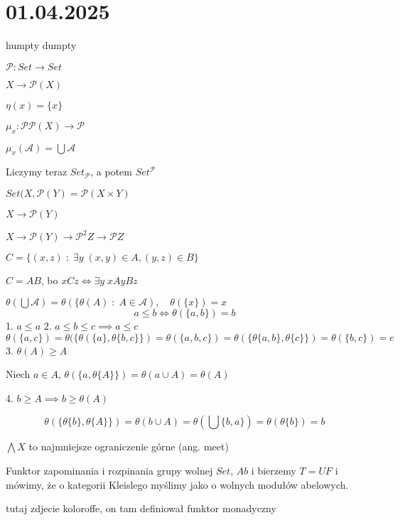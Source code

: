 \section{01.04.2025}{humpty dumpty}

$\mathcal{P}:Set\to Set$

$X\to \mathcal{P}(X)$

$\eta(x)=\{x\}$

$\mu_x:\mathcal{P}\mathcal{P}(X)\to \mathcal{P}$

$\mu_x(\mathcal{A})=\bigcup\mathcal{A}$

Liczymy teraz $Set_\mathcal{P}$, a potem $Set^\mathcal{P}$

$Set(X, \mathcal{P}(Y)=\mathcal{P}(X\times Y)$

$X\to \mathcal{P}(Y)$

$X\to \mathcal{P}(Y)\to\mathcal{P}^2Z\to\mathcal{P}Z$

$C=\{(x, z)\;:\;\exists y\;(x,y)\in A,(y,z)\in B\}$

$C=AB$, bo $xCz\iff \exists y\;xAyBz$

$\theta(\bigcup \mathcal{A})=\theta(\{\theta(A)\;:\;A\in\mathcal{A}),\quad \theta(\{x\})=x$
$$a\leq b\iff \theta(\{a,b\})=b$$
1. $a\leq a$
2. $a\leq b\leq c\implies a\leq c$
$$\theta(\{a, c\})=\theta(\{\theta(\{a\}, \theta\{b,c\}\})=\theta(\{a,b,c\})=\theta(\{\theta\{a,b\}, \theta\{c\}\})=\theta(\{b, c\})=c$$
3. $\theta(A)\geq A$

Niech $a\in A$, $\theta(\{a, \theta\{A\}\})=\theta(a\cup A)=\theta(A)$

4. $b\geq A\implies b\geq \theta(A)$

$$\theta(\{\theta\{b\}, \theta\{A\}\})=\theta(b\cup A)=\theta(\bigcup \{b, a\})=\theta(\theta\{b\})=b$$

$\bigwedge X$ to najmniejsze ograniczenie górne (ang. meet)

\begin{center}
\end{center}

Funktor zapominania i rozpinania grupy wolnej $Set$, $Ab$ i bierzemy $T=UF$ i mówimy, że o kategorii Kleislego myślimy jako o wolnych modułów abelowych.

tutaj zdjecie koloroffe, on tam definiował funktor monadyczny

